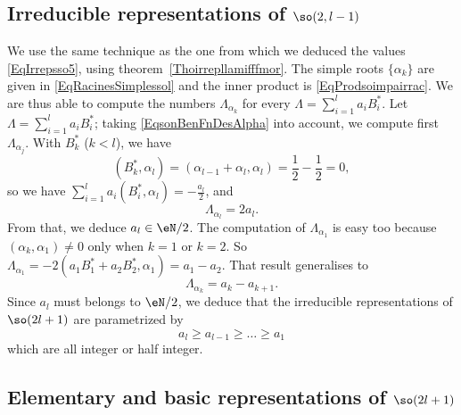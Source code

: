 					\subsection{Irreducible representations of \texorpdfstring{$\so(2,l-1)$}{so2l}}

We use the same technique as the one from which we deduced the values \eqref{EqIrrepsso5}, using theorem~\ref{Thoirrepllamifffmor}. The simple roots $\{ \alpha_k \}$ are given in \eqref{EqRacinesSimplessol} and the inner product is \eqref{EqProdsoimpairrac}. We are thus able to compute the numbers $\Lambda_{\alpha_k}$ for every $\Lambda=\sum_{i=1}^la_iB^*_i$. Let $\Lambda=\sum_{i=1}^la_iB^*_i$; taking \eqref{EqsonBenFnDesAlpha} into account, we compute first $\Lambda_{\alpha_j}$. With $B_k^*$ ($k<l$), we have
\begin{equation}
	(B^*_k,\alpha_l)=(\alpha_{l-1}+\alpha_l,\alpha_l)=\frac{ 1 }{2}-\frac{ 1 }{2}=0,
\end{equation}
so we have $\sum_{i=1}^la_i(B^*_i,\alpha_l)=-\frac{ a_l }{ 2 }$, and
\begin{equation}
	\Lambda_{\alpha_l}=2a_l.
\end{equation}
From that, we deduce $a_l\in\eN/2$. The computation of $\Lambda_{\alpha_1}$ is easy too because $(\alpha_k,\alpha_1)\neq 0$ only when $k=1$ or $k=2$. So $\Lambda_{\alpha_1}=-2(a_1B^*_1+a_2B^*_2,\alpha_1)=a_1-a_2$. That result generalises to
\begin{equation}
	\Lambda_{\alpha_k}=a_k-a_{k+1}.
\end{equation}
Since $a_l$ must belongs to $\eN/2$, we deduce that the irreducible representations of $\so(2l+1)$ are parametrized by
\begin{equation}
	a_l\geq a_{l-1}\geq\ldots\geq a_1
\end{equation}
which are all integer or half integer.

\subsection{Elementary and basic representations of \texorpdfstring{$\so(2l+1)$}{so2l+1}}

